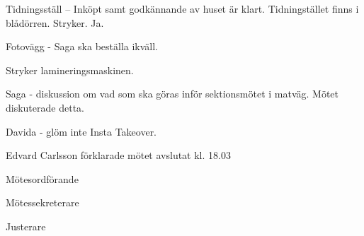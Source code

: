\documentclass[10pt]{article}
\def\mo{Edvard Carlsson}
\def\ms{Mattias Lundström}
\def\ji{Theo}
\begin{document}
\begin{paragrafer}
Tidningsställ -- Inköpt samt godkännande av huset är klart. Tidningstället finns i blådörren. 
Stryker. 
Ja. 

Fotovägg - Saga ska beställa ikväll. 

Stryker lamineringsmaskinen. 



Saga - diskussion om vad som ska göras inför sektionsmötet i matväg. Mötet diskuterade detta. 

Davida - glöm inte Insta Takeover. 



{\mo} förklarade mötet avslutat kl. 18.03
\end{paragrafer}

\hidesignfoot
\begin{signatures}{3}
\signature{\mo}{Mötesordförande}
\signature{\ms}{Mötessekreterare}
\signature{\ji}{Justerare}
\end{signatures}
\end{document}
